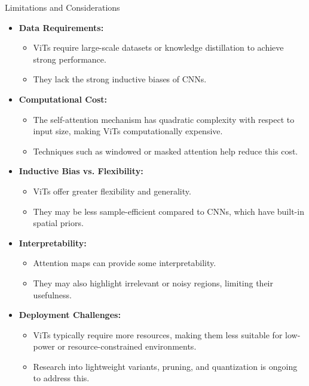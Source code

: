 \begin{frame}[allowframebreaks]{Limitations and Considerations}
    \begin{itemize}
        \item \textbf{Data Requirements:}
        \begin{itemize}
            \item ViTs require large-scale datasets or knowledge distillation to achieve strong performance.
            \item They lack the strong inductive biases of CNNs.
        \end{itemize}

        \item \textbf{Computational Cost:}
        \begin{itemize}
            \item The self-attention mechanism has quadratic complexity with respect to input size, making ViTs computationally expensive.
            \item Techniques such as windowed or masked attention help reduce this cost.
        \end{itemize}

        \item \textbf{Inductive Bias vs. Flexibility:}
        \begin{itemize}
            \item ViTs offer greater flexibility and generality.
            \item They may be less sample-efficient compared to CNNs, which have built-in spatial priors.
        \end{itemize}

        \framebreak

        \item \textbf{Interpretability:}
        \begin{itemize}
            \item Attention maps can provide some interpretability.
            \item They may also highlight irrelevant or noisy regions, limiting their usefulness.
        \end{itemize}

        \item \textbf{Deployment Challenges:}
        \begin{itemize}
            \item ViTs typically require more resources, making them less suitable for low-power or resource-constrained environments.
            \item Research into lightweight variants, pruning, and quantization is ongoing to address this.
        \end{itemize}
    \end{itemize}


\end{frame}
